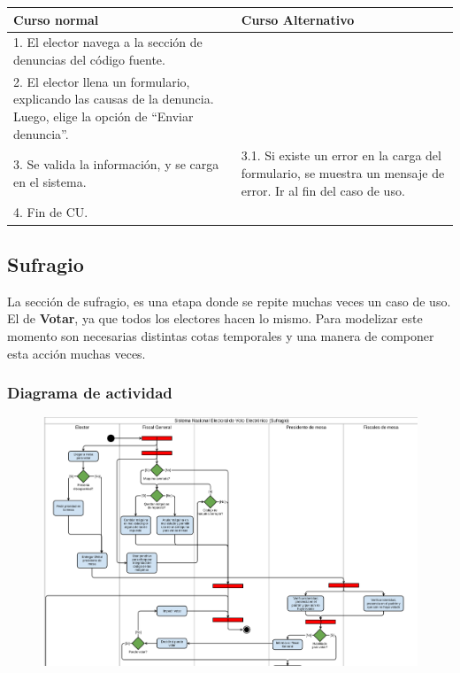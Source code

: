 \begin{table}[h!]
	
 \begin{tabular}{|p{7.5cm} | p{7.5cm}|} 
 \hline
 \textbf{Curso normal} & \textbf{Curso Alternativo} \\
 \hline
1. El elector navega a la sección de denuncias del código fuente. & \\
\hline


2. El elector llena un formulario, explicando las causas de la denuncia. Luego, elige la opción de “Enviar denuncia”. & \\
\hline


3. Se valida la información, y se carga en el sistema. & 3.1. Si existe un error en la carga del formulario, se muestra un mensaje de error. Ir al fin del caso de uso. \\
\hline
4. Fin de CU.& \\
\hline
 \end{tabular}

\end{table}


\newpage

\subsection{Sufragio}

La sección de sufragio, es una etapa donde se repite muchas veces un caso de uso. El de \textbf{Votar}, ya que todos los electores hacen lo mismo. Para modelizar este momento son necesarias distintas cotas temporales y una manera de componer esta acción muchas veces.

\subsubsection{Diagrama de actividad}

\begin{figure}[h!]
\centering
\includegraphics[scale=0.5]{imagenes/actividad/actividadSufragio1}
\end{figure}

